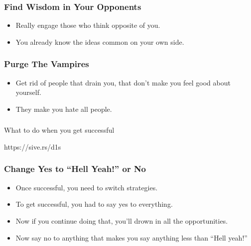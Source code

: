 \begin{frame}[fragile]\frametitle{Find Wisdom in Your Opponents}

\begin{itemize}
\item Really engage those who think opposite of you.
\item You already know the ideas common on your own side.
\end{itemize}

\end{frame}

\begin{frame}[fragile]\frametitle{Purge The Vampires}

\begin{itemize}
\item Get rid of people that drain you, that don’t make you feel good about yourself.
\item They make you hate all people.
\end{itemize}

\end{frame}



\begin{frame}[fragile]\frametitle{}
\begin{center}
{\Large What to do when you get successful}
\end{center}

{\tiny https://sive.rs/d1s}

\end{frame}

\begin{frame}[fragile]\frametitle{Change Yes to ``Hell Yeah!'' or No}

\begin{itemize}
\item Once successful, you need to switch strategies.
\item To get successful, you had to say yes to everything.
\item Now if you continue doing that, you’ll drown in all the opportunities.
\item Now say no to anything that makes you say anything less than “Hell yeah!”
\end{itemize}

\end{frame}

